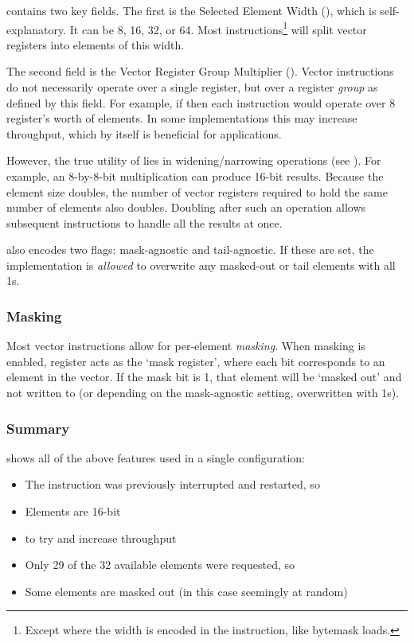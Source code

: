 \subsubsection{}
 contains two key fields.
The first is the Selected Element Width (), which is self-explanatory.
It can be 8, 16, 32, or 64.
Most instructions\footnote{Except where the width is encoded in the instruction, like bytemask loads.} will split vector registers into elements of this width.

The second field is the Vector Register Group Multiplier ().
Vector instructions do not necessarily operate over a single register, but over a register \emph{group} as defined by this field.
For example, if  then each instruction would operate over 8 register's worth of elements.
In some implementations this may increase throughput, which by itself is beneficial for applications.

However, the true utility of  lies in widening/narrowing operations (see ).
For example, an 8-by-8-bit multiplication can produce 16-bit results.
Because the element size doubles, the number of vector registers required to hold the same number of elements also doubles.
Doubling  after such an operation allows subsequent instructions to handle all the results at once.

 also encodes two flags: mask-agnostic and tail-agnostic.
If these are set, the implementation is \emph{allowed} to overwrite any masked-out or tail elements with all 1s.

\subsubsection{Masking}
Most vector instructions allow for per-element \emph{masking}.
When masking is enabled, register  acts as the `mask register', where each bit corresponds to an element in the vector.
If the mask bit is 1, that element will be `masked out' and not written to (or depending on the mask-agnostic setting, overwritten with 1s).

\subsubsection{Summary}
 shows all of the above features used in a single configuration:
\begin{itemize}
    \item The instruction was previously interrupted and restarted, so 
    \item Elements are 16-bit
    \item {} to try and increase throughput
    \item Only 29 of the 32 available elements were requested, so 
    \item Some elements are masked out (in this case seemingly at random)
\end{itemize}

